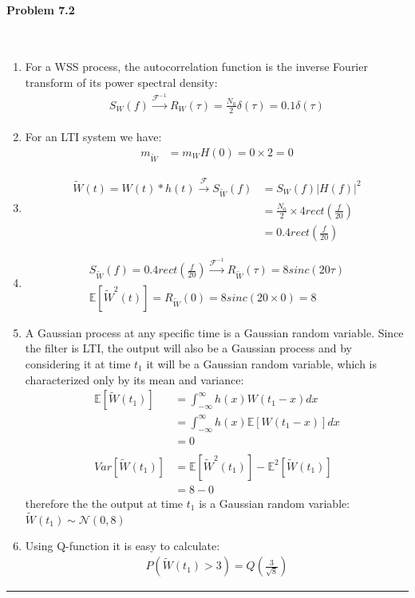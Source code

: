 \documentclass[12pt, letterpaper]{scrartcl}
\begin{document}
\paragraph*{Problem 7.2} \hfill\\
\begin{enumerate} [((a))]
    \item For a WSS process, the autocorrelation function is the inverse Fourier transform of its power spectral density:
    \begin{align*}
        S_{W}(f)\xrightarrow[]{\mathcal{F}^{-1}}R_{W}(\tau)=\frac{N_0}{2}\delta(\tau)=0.1\delta(\tau)
    \end{align*}

    \item For an LTI system we have:
    \begin{align*}
        m_{\widetilde{W}} &= m_W H(0)=0\times2=0
    \end{align*}

    \item
    \begin{align*}
        \widetilde{W}(t)=W(t)*h(t)\xrightarrow[]{\mathcal{F}} S_{\widetilde{W}}(f)&=S_W(f)|H(f)|^2\\
        &=\frac{N_0}{2}\times4rect(\frac{f}{20})\\
        &=0.4rect(\frac{f}{20})
    \end{align*}

    \item 
    \begin{align*}
    S_{\widetilde{W}}(f)=0.4rect(\frac{f}{20})\xrightarrow[]{\mathcal{F}^{-1}}R_{\widetilde{W}}(\tau)=8sinc(20\tau)\\
        \mathbb{E}[\widetilde{W}^2(t)]=R_{\widetilde{W}}(0)=8sinc(20\times0)=8
    \end{align*}

    \item
    A Gaussian process at any specific time is a Gaussian random variable. Since the filter is LTI, the output will also be a Gaussian process and by considering it at time $t_1$ it will be a Gaussian random variable, which is characterized only by its mean and variance:
    \begin{align*}
        \mathbb{E}[\widetilde{W}(t_1)]&=\int_{-\infty}^\infty h(x)W(t_1-x)dx\\
        &=\int_{-\infty}^\infty h(x)\mathbb{E}[W(t_1-x)]dx\\
        &=0\\\\
        Var[\widetilde{W}(t_1)] &= \mathbb{E}[\widetilde{W}^2(t_1)]-\mathbb{E}^2[\widetilde{W}(t_1)]\\
        &=8-0
    \end{align*}
    therefore the the output at time $t_1$ is a Gaussian random variable: $\widetilde{W}(t_1)\sim \mathcal{N}(0,8)$

    \item
    Using Q-function it is easy to calculate:
    \begin{align*}
        P(\widetilde{W}(t_1)>3)=Q(\frac{3}{\sqrt{8}})
    \end{align*}
\end{enumerate}
\hrule
\end{document}
